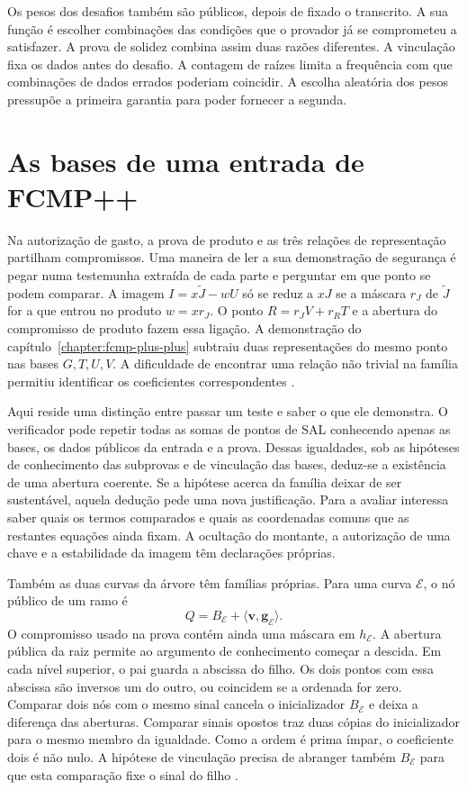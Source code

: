 Os pesos dos desafios também são públicos, depois de fixado o
transcrito. A sua função é escolher combinações das condições que o
provador já se comprometeu a satisfazer. A prova de solidez combina
assim duas razões diferentes. A vinculação fixa os dados antes do
desafio. A contagem de raízes limita a frequência com que combinações
de dados errados poderiam coincidir. A escolha aleatória dos pesos
pressupõe a primeira garantia para poder fornecer a segunda.

\section{As bases de uma entrada de FCMP++}

Na autorização de gasto, a prova de produto e as três relações de
representação partilham compromissos. Uma maneira de ler a sua
demonstração de segurança é pegar numa testemunha extraída de cada
parte e perguntar em que ponto se podem comparar. A imagem
\(I=x\widetilde J-wU\) só se reduz a \(xJ\) se a máscara
\(r_J\) de \(\widetilde J\) for a que entrou no produto \(w=xr_J\).
O ponto \(R=r_JV+r_RT\) e a abertura do compromisso de produto
fazem essa ligação. A demonstração do
capítulo~\ref{chapter:fcmp-plus-plus} subtraiu duas representações
do mesmo ponto nas bases \(G,T,U,V\). A dificuldade de encontrar
uma relação não trivial na família permitiu identificar os
coeficientes correspondentes \cite{fcmp-composition-review}.

Aqui reside uma distinção entre passar um teste e saber o que ele
demonstra. O verificador pode repetir todas as somas de pontos de SAL
conhecendo apenas as bases, os dados públicos da entrada e a prova.
Dessas igualdades, sob as hipóteses de conhecimento das subprovas e
de vinculação das bases, deduz-se a existência de uma abertura
coerente. Se a hipótese acerca da família deixar de ser sustentável,
aquela dedução pede uma nova justificação. Para a avaliar interessa
saber quais os termos comparados e quais as coordenadas comuns que
as restantes equações ainda fixam. A ocultação do montante, a
autorização de uma chave e a estabilidade da imagem têm declarações
próprias.

Também as duas curvas da árvore têm famílias próprias. Para uma
curva \(\mathcal E\), o nó público de um ramo é
\[
 Q=B_{\mathcal E}+\langle\boldsymbol v,\boldsymbol g_{\mathcal E}\rangle .
\]
O compromisso usado na prova contém ainda uma máscara em
\(h_{\mathcal E}\). A abertura pública da raiz permite ao argumento
de conhecimento começar a descida. Em cada nível superior, o pai
guarda a abscissa do filho. Os dois pontos com essa abscissa são
inversos um do outro, ou coincidem se a ordenada for zero. Comparar
dois nós com o mesmo sinal cancela o inicializador \(B_{\mathcal E}\)
e deixa a diferença das aberturas. Comparar sinais opostos traz duas
cópias do inicializador para o mesmo membro da igualdade. Como a
ordem é prima ímpar, o coeficiente dois é não nulo. A hipótese de
vinculação precisa de abranger também \(B_{\mathcal E}\) para que
esta comparação fixe o sinal do filho
\cite{fcmp-plus-plus-paper,monero-oxide-fcmp-source}.

